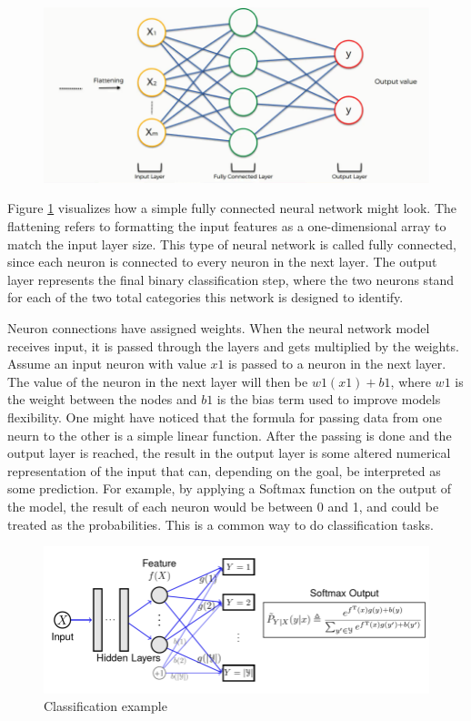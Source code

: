 \begin{figure}[H]
    \centering
    \includegraphics[scale=0.9]{figures/ffcexample}
    \label{Simple neural network example}
\end{figure}

Figure \ref{Simple neural network example} visualizes how a simple fully connected neural network might look. The flattening refers to formatting the input features as a one-dimensional array to match the input layer size. This type of neural network is called fully connected, since each neuron is connected to every neuron in the next layer. The output layer represents the final binary classification step, where the two neurons stand for each of the two total categories this network is designed to identify.

Neuron connections have assigned weights. When the neural network model receives input, it is passed through the layers and gets multiplied by the weights. Assume an input neuron with value $x1$ is passed to a neuron in the next layer. The value of the neuron in the next layer will then be $w1(x1) + b1$, where $w1$ is the weight between the nodes and $b1$ is the bias term used to improve models flexibility. One might have noticed that the formula for passing data from one neurn to the other is a simple linear function. After the passing is done and the output layer is reached, the result in the output layer is some altered numerical representation of the input that can, depending on the goal, be interpreted as some prediction. For example, by applying a Softmax function on the output of the model, the result of each neuron would be between 0 and 1, and could be treated as the probabilities. This is a common way to do classification tasks. 

\begin{figure}[H]
    \centering
    \includegraphics[scale=0.6]{figures/classificationExample}
    \caption{Classification example}
    \label{Classification example}
\end{figure}

